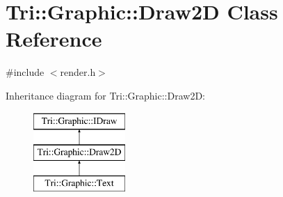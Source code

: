 \hypertarget{class_tri_1_1_graphic_1_1_draw2_d}{}\section{Tri\+:\+:Graphic\+:\+:Draw2\+D Class Reference}
\label{class_tri_1_1_graphic_1_1_draw2_d}


{\ttfamily \#include $<$render.\+h$>$}

Inheritance diagram for Tri\+:\+:Graphic\+:\+:Draw2\+D\+:\begin{figure}[H]
\begin{center}
\leavevmode
\includegraphics[height=3.000000cm]{class_tri_1_1_graphic_1_1_draw2_d}
\end{center}
\end{figure}

